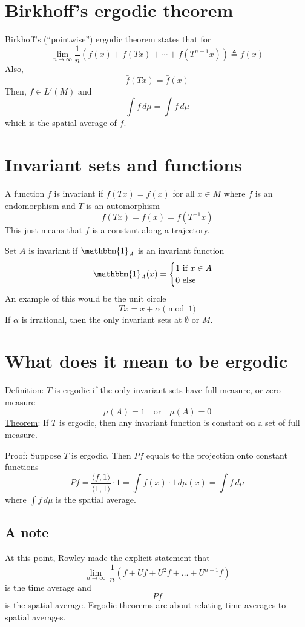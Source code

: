 \documentclass{article}
\begin{document}
\section{Birkhoff's ergodic theorem}

Birkhoff's (``pointwise'') ergodic theorem states that for 
\[
\lim_{n\to\infty} \frac{1}{n}\left(f(x)+f(Tx)+\cdots + f(T^{n-1}x)\right)\triangleq \bar{f}(x)
\]
Also, 
\[
\bar{f}(Tx) = \bar{f}(x)
\]
Then, $\bar{f}\in L'(M)$ and 
\[
\int \bar{f}\, d\mu = \int f\, d\mu
\]
which is the spatial average of $f$.

\section{Invariant sets and functions}

A function $f$ is invariant if $f(Tx)=f(x)$ for all $x\in M$ where $f$ is an endomorphism and $T$ is an automorphism
\[
f(Tx) = f(x) = f(T^{-1}x)
\]
This just means that $f$ is a constant along a trajectory.

Set $A$ is invariant if $\mathbbm{1}_A$ is an invariant function
\[
\mathbbm{1}_A(x)=\begin{cases}
    1 \text{ if } x\in A\\
    0 \text{ else}
\end{cases}
\]
An example of this would be the unit circle 
\[
Tx = x+\alpha \pmod 1
\]
If $\alpha$ is irrational, then the only invariant sets at $\emptyset$ or $M$.

\section{What does it mean to be ergodic}

\underline{Definition}: $T$ is ergodic if the only invariant sets have full measure, or zero measure
\[
\mu(A) = 1 \quad \text{or} \quad \mu(A)=0
\]
\underline{Theorem}: If $T$ is ergodic, then any invariant function is constant on a set of full measure.

Proof: Suppose $T$ is ergodic. Then $Pf$ equals to the projection onto constant functions
\[
Pf = \frac{\langle f, 1\rangle}{\langle 1, 1\rangle}\cdot 1 = \int f(x)\cdot 1 \, d\mu(x) = \int f\, d\mu
\]
where $\int f\, d\mu$ is the spatial average.

\subsection{A note}

At this point, Rowley made the explicit statement that 
\[
\lim_{n\to\infty}\,\frac{1}{n}\left(f+ Uf + U^2 f +\ldots + U^{n-1}f\right)
\]
is the time average and 
\[ Pf\]
is the spatial average. Ergodic theorems are about relating time averages to spatial averages.
\end{document}
